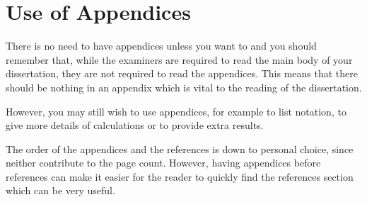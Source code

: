 \chapter{Use of Appendices}

There is no need to have appendices unless you want to and you should remember that, while the examiners are required to read the main body of your dissertation, they are not required to read the appendices. This means that there should be nothing in an appendix which is vital to the reading of the dissertation.

However, you may still wish to use appendices, for example to list notation, to give more details of calculations or to provide extra results.

The order of the appendices and the references is down to personal choice, since neither contribute to the page count. However, having appendices before references can make it easier for the reader to quickly find the references section which can be very useful.